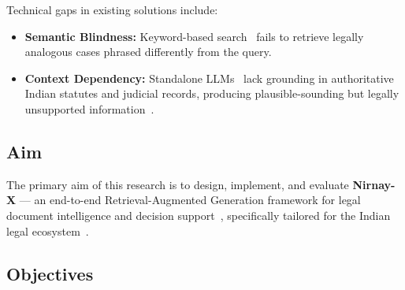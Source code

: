 \documentclass[12pt,a4paper]{article}
\begin{document}
Technical gaps in existing solutions include:

\begin{itemize}[leftmargin=*]
  \item \textbf{Semantic Blindness:} Keyword-based search~\cite{manning2008ir} fails to
    retrieve legally analogous cases phrased differently from the query.
  \item \textbf{Context Dependency:} Standalone LLMs~\cite{vaswani2017attention} lack
    grounding in authoritative Indian statutes and judicial records, producing
    plausible-sounding but legally unsupported information~\cite{guha2023legalbench}.
\end{itemize}

\subsection{Aim}

The primary aim of this research is to design, implement, and evaluate
\textbf{Nirnay-X} --- an end-to-end Retrieval-Augmented Generation framework
for legal document intelligence and decision support~\cite{lewis2020rag},
specifically tailored for the Indian legal ecosystem~\cite{ecourts, indiankanoon}.

\subsection{Objectives}
\end{document}
